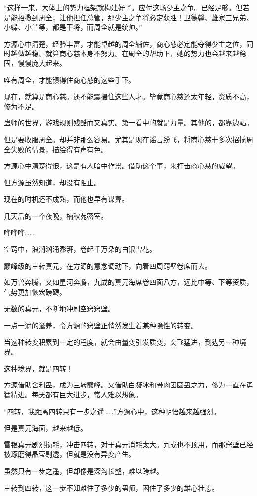 \begin{this_body}
“这样一来，大体上的势力框架就构建好了。应付这场少主之争。已经足够。但若是能招揽到周全，让他担任总管，那少主之争将必定获胜！卫德馨、雄家三兄弟、小蝶、小兰等，都是干将，而周全就是统帅。”

方源心中清楚，经验丰富，才能卓越的周全辅佐，商心慈必定能夺得少主之位，同时越做越稳。就算商心慈本身不努力。在周全的帮助下，她的势力也会越来越稳固，慢慢庞大起来。

唯有周全，才能镇得住商心慈的这些手下。

现在，就算是商心慈。还不能震摄住这些人才。毕竟商心慈还太年轻，资质不高，修为不足。

蛊师的世界，游戏规则残酷而又真实。第一看中的就是力量。其他的，都靠边站。

但是要收服周全。却并非那么容易。尤其是现在谣言纷飞，将商心慈十多次招揽周全失败的情景，描绘得有声有色。

方源心中清楚得很，这是有人暗中作祟。借助这个事，来打击商心慈的威望。

但方源虽然知道，却没有阻止。

现在的时机还不成熟，而他也早有谋算。

几天后的一个夜晚，楠秋苑密室。

哗哗哗……

空窍中，浪潮汹涌澎湃，卷起千万朵的白银雪花。

巅峰级的三转真元，在方源的意念调动下，向着四周窍壁卷席而去。

如万兽奔腾，又如星河奔腾，九成的真元海席卷四面八方，远比中等、下等资质，气势更加恢宏磅礴。

无数的真元，不断地冲刷空窍窍壁。

一点一滴的滋养，令方源的窍壁正悄然发生着某种隐性的转变。

当这种转变积累到一定的程度，就会由量变引发质变，突飞猛进，到达另一种境界。

这种境界，就是四转！

方源借助舍利蛊，成为三转巅峰。又借助白凝冰和骨肉团圆蛊之力，修为一直在勇猛精进。每天都有巨大进步，常人难以想象。

“四转，我距离四转只有一步之遥……”方源心中，这种明悟越来越强烈。

但是真元海面，越来越低。

雪银真元剧烈损耗，冲击四转，对于真元消耗太大。九成也不顶用，而那窍壁已经被琢磨得晶莹剔透，但就是没有异变产生。

虽然只有一步之遥，但却像是深沟长壑，难以跨越。

三转到四转，这一步不知难住了多少的蛊师，困住了多少的雄心壮志。


\end{this_body}
